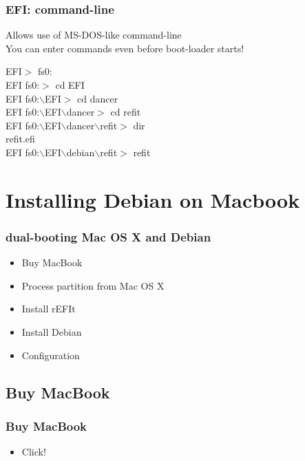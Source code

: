 \documentclass[cjk,dvipdfm]{beamer}
\begin{document}
\begin{frame}
\frametitle{EFI: command-line}

Allows use of MS-DOS-like command-line\\
You can enter commands even before boot-loader starts!

EFI$>$ fs0:\\
EFI fs0:$>$ cd EFI\\
EFI fs0:$\backslash{}$EFI$>$ cd dancer\\
EFI fs0:$\backslash{}$EFI$\backslash{}$dancer$>$ cd refit\\
EFI fs0:$\backslash{}$EFI$\backslash{}$dancer$\backslash{}$refit$>$ dir\\
refit.efi\\
 EFI fs0:$\backslash{}$EFI$\backslash{}$debian$\backslash{}$refit$>$ refit

\end{frame}

\section{Installing Debian on Macbook}

\begin{frame}
 \frametitle{dual-booting Mac OS X and Debian}
 \begin{minipage}{0.5\hsize}
  \begin{itemize}
   \item Buy MacBook
   \item Process partition from Mac OS X
   \item Install rEFIt 
   \item Install Debian
   \item Configuration
  \end{itemize}
 \end{minipage}
\end{frame}

\subsection{Buy MacBook} 

\begin{frame}
 \frametitle{Buy MacBook}
 \begin{minipage}{0.5\hsize}
  \begin{itemize}
   \item Click!
  \end{itemize}
 \end{minipage}
\end{frame}
\end{document}
